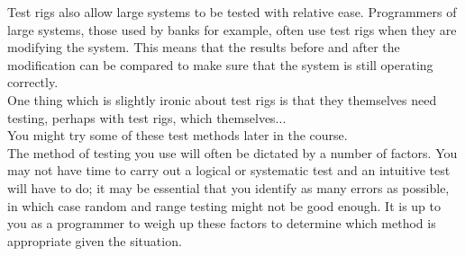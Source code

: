 Test rigs also allow large systems to be tested with relative ease. Programmers
of large systems, those used by banks for example, often use test rigs 
when they are modifying the system. This means that the results before and after 
the modification can be compared to make sure that the system is still 
operating correctly. \\

One thing which is slightly ironic about test rigs is that they
themselves need testing, perhaps with test rigs, which themselves... \\

You might try some of these test methods later in the course. \\

The method of testing you use will often be dictated by a number of factors. 
You may not have time to carry out a logical or systematic test and an
intuitive test will have to do; it may be essential that you identify as many errors as 
possible, in which case random and range testing might not be good enough. It 
is up to you as a programmer to weigh up these factors to determine which 
method is appropriate given the situation. 
 
